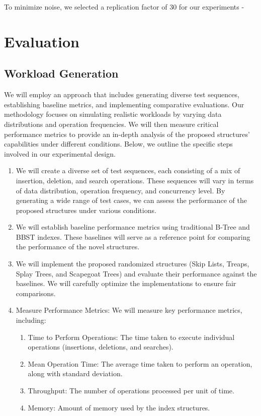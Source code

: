 \documentclass[sigconf]{acmart}
\begin{document}
To minimize noise, we selected a replication factor of 30 for our experiments - 

\section{Evaluation}

\subsection {Workload Generation}

We will employ an approach that includes generating diverse test sequences, establishing baseline metrics, and implementing comparative evaluations. Our methodology focuses on simulating realistic workloads by varying data distributions and operation frequencies. We will then measure critical performance metrics to provide an in-depth analysis of the proposed structures' capabilities under different conditions. Below, we outline the specific steps involved in our experimental design.

\begin{enumerate}
    \item We will create a diverse set of test sequences, each consisting of a mix of insertion, deletion, and search operations. These sequences will vary in terms of data distribution, operation frequency, and concurrency level. By generating a wide range of test cases, we can assess the performance of the proposed structures under various conditions.

    \item We will establish baseline performance metrics using traditional B-Tree and BBST indexes. These baselines will serve as a reference point for comparing the performance of the novel structures.

    \item  We will implement the proposed randomized structures (Skip Lists, Treaps, Splay Trees, and Scapegoat Trees) and evaluate their performance against the baselines. We will carefully optimize the implementations to ensure fair comparisons.

    \item Measure Performance Metrics: We will measure key performance metrics, including:
    \begin{enumerate}
        \item Time to Perform Operations: The time taken to execute individual operations (insertions, deletions, and searches).
        
        \item Mean Operation Time: The average time taken to perform an operation, along with standard deviation.

        \item Throughput: The number of operations processed per unit of time.

        \item Memory: Amount of memory used by the index structures.
    \end{enumerate}
\end{enumerate}
        
\end{document}

